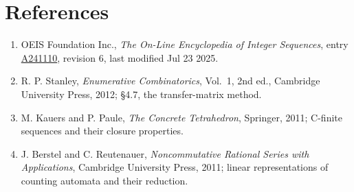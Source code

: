 \documentclass[11pt]{article}
\theoremstyle{definition}
\begin{document}
\section{References}

\begin{enumerate}

\item OEIS Foundation Inc., \emph{The On-Line Encyclopedia of Integer Sequences}, entry \href{https://oeis.org/A241110}{A241110}, revision 6, last modified Jul 23 2025.

\item R. P. Stanley, \emph{Enumerative Combinatorics}, Vol.~1, 2nd ed., Cambridge University Press, 2012; \S4.7, the transfer-matrix method.

\item M. Kauers and P. Paule, \emph{The Concrete Tetrahedron}, Springer, 2011; C-finite sequences and their closure properties.

\item J. Berstel and C. Reutenauer, \emph{Noncommutative Rational Series with Applications}, Cambridge University Press, 2011; linear representations of counting automata and their reduction.

\end{enumerate}
\end{document}
